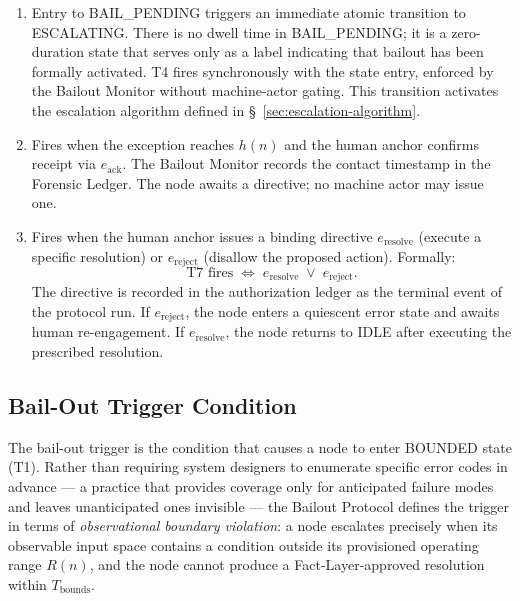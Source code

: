 \begin{enumerate}
\item[\textbf{T4 — BAIL\_PENDING $\rightarrow$ ESCALATING (activation):}] Entry to BAIL\_PENDING triggers an immediate atomic transition to ESCALATING. There is no dwell time in BAIL\_PENDING; it is a zero-duration state that serves only as a label indicating that bailout has been formally activated. T4 fires synchronously with the state entry, enforced by the Bailout Monitor without machine-actor gating. This transition activates the escalation algorithm defined in \S~\ref{sec:escalation-algorithm}.

\item[\textbf{T5 — ESCALATING $\rightarrow$ HUMAN\_ACKNOWLEDGED (contact):}] Fires when the exception reaches $h(n)$ and the human anchor confirms receipt via $e_{\text{ack}}$. The Bailout Monitor records the contact timestamp in the Forensic Ledger. The node awaits a directive; no machine actor may issue one.

\item[\textbf{T7 — ESCALATING $\rightarrow$ RESOLVED (directive):}] Fires when the human anchor issues a binding directive $e_{\text{resolve}}$ (execute a specific resolution) or $e_{\text{reject}}$ (disallow the proposed action). Formally:
\begin{equation}
\text{T7 fires} \;\iff\; e_{\text{resolve}} \;\lor\; e_{\text{reject}}. \tag{T7}
\end{equation}
The directive is recorded in the authorization ledger as the terminal event of the protocol run. If $e_{\text{reject}}$, the node enters a quiescent error state and awaits human re-engagement. If $e_{\text{resolve}}$, the node returns to IDLE after executing the prescribed resolution.
\end{enumerate}

\subsection{Bail-Out Trigger Condition}
\label{sec:bailout-trigger}

The bail-out trigger is the condition that causes a node to enter BOUNDED state (T1). Rather than requiring system designers to enumerate specific error codes in advance — a practice that provides coverage only for anticipated failure modes and leaves unanticipated ones invisible — the Bailout Protocol defines the trigger in terms of \emph{observational boundary violation}: a node escalates precisely when its observable input space contains a condition outside its provisioned operating range $R(n)$, and the node cannot produce a Fact-Layer-approved resolution within $T_{\text{bounds}}$.


